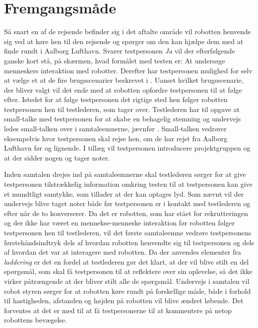 \section{Fremgangsmåde}
\label{ParametreFremgangsmaade}
%
Så snart en af de rejsende befinder sig i det aftalte område vil robotten henvende sig ved at køre hen til den rejsende og spørger om den kan hjælpe dem med at finde rundt i Aalborg Lufthavn. Svarer testpersonen \textit{Ja} vil der efterfølgende ganske kort stå, på skærmen, hvad formålet med testen er: At undersøge menneskers interaktion med robotter. Derefter har testpersonen mulighed for selv at vælge et at de fire brugsscenarier beskrevet i . Uanset hvilket brugsscenarie, der bliver valgt vil det ende med at robotten opfordre testpersonen til at følge efter. Istedet for at følge testpersonen det rigtige sted hen følger robotten testpersonen hen til testlederen, som tager over. Testlederen har til opgave at small-talke med testpersonen for at skabe en behagelig stemning og undervejs ledes small-talken over i samtaleemnerne, jævnfør . Small-talken vedrører eksempelvis hvor testpersonen skal rejse hen, om de har rejst fra Aalborg Lufthavn før og lignende. I tillæg vil testpersonen introducere projektgruppen og at der sidder nogen og tager noter. 

Inden samtalen drejes ind på samtaleemnerne skal testlederen sørger for at give testpersonen tilstrækkelig information omkring testen til at testpersonen kan give et mundtligt samtykke, som tillader at der kan optages lyd. Som nævnt vil der undervejs blive taget noter både før testpersonen er i kontakt med testlederen og efter når de to konverserer. \blankline
%
Da det er robotten, som har stået for rekrutteringen og der ikke har været en mennekse-menneske interaktion før robotten følger testpersonen hen til testlederen, vil det første samtaleemne vedrøre testpersonens førstehåndsindtryk dels af hvordan robotten henvendte sig til testpersonen og dels af hvordan det var at interagere med robotten. Da der anvendes elementer fra \textit{laddering} er det en fordel at testlederen gør det klart, at der vil blive stilt en del spørgsmål, som skal få testpersonen til at reflektere over sin oplevelse, så det ikke virker påtrængende at der bliver stilt alle de spørgsmål. Undervejs i samtalen vil robot styren sørger for at robotten køre rundt på forskellige måde, både i forhold til hastigheden, afstanden og højden på robotten vil blive ændret løbende. Det forventes at det er med til at få testpersonerne til at kommentere på netop robottens bevægelse. 

